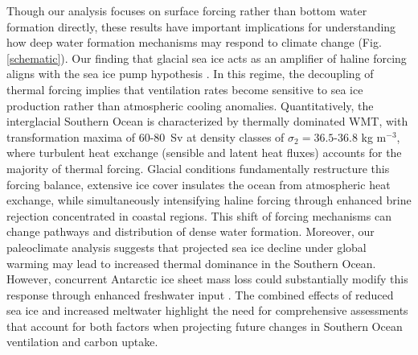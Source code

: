 \documentclass[pdflatex,sn-nature]{sn-jnl}
\begin{document}
Though our analysis focuses on surface forcing rather than bottom water formation directly, these results have important implications for understanding how deep water formation mechanisms may respond to climate change (Fig. \ref{schematic}). Our finding that glacial sea ice acts as an amplifier of haline forcing aligns with the sea ice pump hypothesis \cite{Abernathey2016}. In this regime, the decoupling of thermal forcing implies that ventilation rates become sensitive to sea ice production rather than atmospheric cooling anomalies. Quantitatively, the interglacial Southern Ocean is characterized by thermally dominated WMT, with transformation maxima of 60-80~Sv at density classes of $\sigma_2 = 36.5$-$36.8$ kg m$^{-3}$, where turbulent heat exchange (sensible and latent heat fluxes) accounts for the majority of thermal forcing. Glacial conditions fundamentally restructure this forcing balance, extensive ice cover insulates the ocean from atmospheric heat exchange, while simultaneously intensifying haline forcing through enhanced brine rejection concentrated in coastal regions. This shift of forcing mechanisms can change pathways and distribution of dense water formation. Moreover, our paleoclimate analysis suggests that projected sea ice decline under global warming may lead to increased thermal dominance in the Southern Ocean.  However, concurrent Antarctic ice sheet mass loss could substantially modify this response through enhanced freshwater input \cite{Li2023Nature,Silvano2018}. The combined effects of reduced sea ice and increased meltwater highlight the need for comprehensive  assessments that account for both factors when projecting future changes in Southern Ocean ventilation and carbon uptake.
\end{document}
